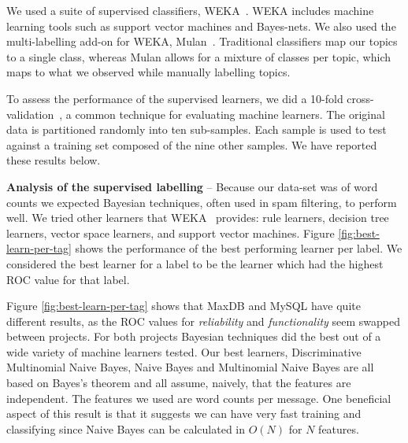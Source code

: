 \documentclass[]{sig-alternate}
\begin{document}
We used a suite of supervised classifiers, WEKA~\cite{weka09}. 
WEKA includes machine learning tools such as support vector machines and Bayes-nets. 
We also used the multi-labelling add-on for WEKA, Mulan~\cite{mulan}. %
Traditional classifiers map our topics to a single class, whereas Mulan allows for a mixture of classes per topic, which maps to what we observed while manually labelling topics.

To assess the performance of the supervised learners, we did a 10-fold cross-validation~\cite{Kohavi1995}, a common technique for evaluating machine learners. 
The original data is partitioned randomly into ten sub-samples. Each sample is used to test against a training set composed of the nine other samples.
We have reported these results below.%

\textbf{Analysis of the supervised labelling} -- 
Because our data-set was of word counts we expected Bayesian techniques, often used in spam filtering, to perform well. 
We tried other learners that WEKA~\cite{weka09} provides: rule learners, decision tree learners, vector space learners, and support vector machines.  
Figure \ref{fig:best-learn-per-tag} shows the performance of the best performing learner per label. 
 We considered the best learner for a label to be the learner which had the highest ROC value for that label. 

Figure \ref{fig:best-learn-per-tag} shows that MaxDB and MySQL have quite different results, as the ROC values for \emph{reliability} and \emph{functionality} seem swapped between projects. 
For both projects Bayesian techniques did the best out of a wide variety of machine learners tested. 
Our best learners, Discriminative Multinomial Naive Bayes, Naive Bayes  and Multinomial Naive Bayes  are all based on Bayes's theorem and all assume, naively, that the features are independent. 
The features we used are word counts per message. 
One beneficial aspect of this result is that it suggests we can have very fast training and classifying  since Naive Bayes can be calculated in $O(N)$ for $N$ features.
\end{document}
